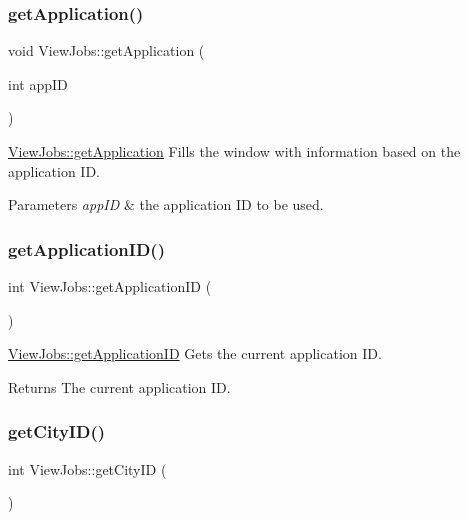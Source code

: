 \subsubsection{\texorpdfstring{get\+Application()}{getApplication()}}
{\footnotesize\ttfamily void View\+Jobs\+::get\+Application (\begin{DoxyParamCaption}\item[{int}]{app\+ID }\end{DoxyParamCaption})}



\hyperlink{class_view_jobs_ae9c1c806aa1dd5082b38a1dc9cbec39e}{View\+Jobs\+::get\+Application} Fills the window with information based on the application ID. 


\begin{DoxyParams}{Parameters}
{\em app\+ID} & the application ID to be used. \\
\hline
\end{DoxyParams}
\mbox{\label{class_view_jobs_a086650882ad80acb4074cf697f8cddcb}} 
\subsubsection{\texorpdfstring{get\+Application\+I\+D()}{getApplicationID()}}
{\footnotesize\ttfamily int View\+Jobs\+::get\+Application\+ID (\begin{DoxyParamCaption}{ }\end{DoxyParamCaption})}



\hyperlink{class_view_jobs_a086650882ad80acb4074cf697f8cddcb}{View\+Jobs\+::get\+Application\+ID} Gets the current application ID. 

\begin{DoxyReturn}{Returns}
The current application ID. 
\end{DoxyReturn}
\mbox{\label{class_view_jobs_adcafeca350b21a033aa630e042ee7947}} 
\subsubsection{\texorpdfstring{get\+City\+I\+D()}{getCityID()}}
{\footnotesize\ttfamily int View\+Jobs\+::get\+City\+ID (\begin{DoxyParamCaption}{ }\end{DoxyParamCaption})}



